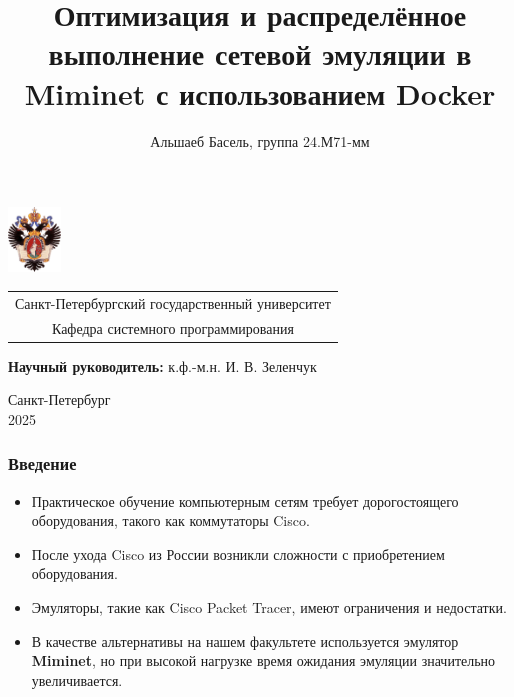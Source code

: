 \documentclass{beamer}
\title[Оптимизация Miminet]{Оптимизация и распределённое выполнение сетевой эмуляции в Miminet с использованием Docker}
\institute[СПбГУ]{}
\author[Альшаеб Басель]{Альшаеб Басель, группа 24.М71-мм}
\begin{document}
{
\begin{frame}
  \includegraphics[width=1.4cm]{pictures/SPbGU_Logo.png}
\vspace{-35pt}
\hspace{-10pt}
\begin{center}
   \begin{tabular}{c}
        \scriptsize{Санкт-Петербургский государственный университет} \\
        \scriptsize{Кафедра системного программирования}
    \end{tabular}
\titlepage
\end{center}

\btVFill

{\scriptsize
   \textbf{Научный руководитель:} к.ф.-м.н. И. В. Зеленчук \\
 }
\begin{center}
  \vspace{5pt}
  \scriptsize{Санкт-Петербург\\
                 2025}
  \end{center}

\end{frame}
}

\begin{frame}[fragile]
  \frametitle{Введение}
  \begin{itemize}
    \item Практическое обучение компьютерным сетям требует дорогостоящего оборудования, такого как коммутаторы Cisco.
    \item После ухода Cisco из России возникли сложности с приобретением оборудования.
    \item Эмуляторы, такие как Cisco Packet Tracer, имеют ограничения и недостатки.
    \item В качестве альтернативы на нашем факультете используется эмулятор \textbf{Miminet}, но при высокой нагрузке время ожидания эмуляции значительно увеличивается.
  \end{itemize}
\end{frame}
\end{document}
